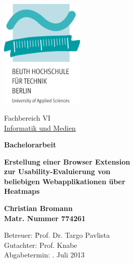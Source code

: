 %
%

\thispagestyle{empty}

\begin{center}

\vspace*{-1cm}

\includegraphics[width=0.3\textwidth]{./images/beuth_logo}

\vspace{1cm}

Fachbereich VI\\
\href{http://fb6.beuth-hochschule.de}{Informatik und Medien}

\vspace{1.3cm}

{\Large \textbf{Bachelorarbeit}}\\ 

\vspace{1cm}

{\Huge \textbf{Erstellung einer Browser Extension}}\\
\vspace*{3mm}
{\Huge \textbf{zur Usability-Evaluierung von}}\\
\vspace*{3mm}
{\Huge \textbf{beliebigen Webapplikationen über}}\\
\vspace*{3mm}
{\Huge \textbf{Heatmaps}}\\

\vspace{1.5cm}

{\Large \textbf{Christian Bromann}}\\ 
\textbf{Matr. Nummer 774261}

\vspace{1.5cm}

\parbox{1cm}{
\begin{large}
\begin{tabbing}
Betreuer: \hspace{1.5cm}\=Prof. Dr. Targo Pavlista\\[1mm]
Gutachter: \>Prof. Knabe\\[2mm]
Abgabetermin: . Juli 2013\\
\end{tabbing}
\end{large}}\\

\end{center}

\newpage
